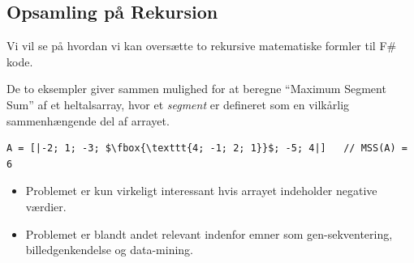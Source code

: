 \documentclass[rgb]{beamer}
\begin{document}
\begin{frame}[fragile]
\begin{footnotesize}
\begin{minipage}[b]{0.3\textwidth}
\end{minipage}

\end{footnotesize}
\end{frame}


\subsection{Opsamling på Rekursion}
\begin{frame}[fragile]
\begin{footnotesize}

  \vspace{1ex}

  Vi vil se på hvordan vi kan oversætte to rekursive matematiske formler til F\# kode.

  \vspace{1ex}

  De to eksempler giver sammen mulighed for at beregne ``Maximum Segment
  Sum'' af et heltalsarray, hvor et \emph{segment} er defineret som
  en vilkårlig sammenhængende del af arrayet.

  \vspace{1ex}

\begin{lstlisting}[numbers=none,frame=none,mathescape]
  A = [|-2; 1; -3; $\fbox{\texttt{4; -1; 2; 1}}$; -5; 4|]   // MSS(A) = 6
\end{lstlisting}

  \vspace{1ex}

\begin{itemize}
\item Problemet er kun virkeligt interessant hvis arrayet indeholder negative værdier.
\item Problemet er blandt andet relevant indenfor emner som gen-sekventering, billedgenkendelse og data-mining.
\end{itemize}

\end{footnotesize}
\end{frame}
\end{document}
